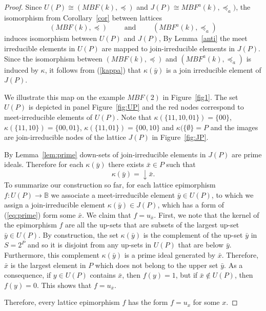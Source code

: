 \documentclass[10pt,letterpaper]{article}
\newcommand{\bbB}{\mathbb{B}}
\begin{document}
\begin{proof}
Since $U(P) \cong (MBF(k),\preceq)$ and $J(P) \cong MBF^a(k), \preceq_a)$, the isomorphism from Corollary~\ref{cor} between lattices 
\[ (MBF(k), \preceq) \qquad \mbox{ and } \qquad (MBF^a(k),\preceq_a) \]
induces isomorphism between $U(P)$ and $J(P)$, By Lemma~\ref{anti} the meet irreducible elements in $U(P)$ are mapped to join-irreducible elements in $J(P)$. Since the isomorphism between $(MBF(k), \preceq)$ and $(MBF^a(k),\preceq_a)$ is induced by $\kappa$, it follows from (\ref{kappa}) that 
$\kappa (\bar y)$ is a join irreducible element of $J(P)$.
 
We illustrate this map on the example $MBF(2)$ in Figure~\ref{fig1}. The set $U(P)$ is depicted in panel Figure~\ref{fig:UP} and the red nodes correspond to meet-irreducible elements of $U(P)$. Note that $\kappa(\{11,10,01\}) =\{00\} $, $\kappa(\{11,10\})= \{00,01\} $, $\kappa(\{11,01\}) =\{00, 10\} $ and $\kappa(\{\emptyset\} =P $ and the images are join-irreducible nodes of the lattice
$J(P)$ in Figure~\ref{fig:JP}.
 
By Lemma~\ref{lem:prime} down-sets of join-irreducible elements in $J(P)$ are prime ideals. Therefore for each $\kappa (\bar y)$ there exists $\bar x \in P$ such that 
\begin{equation}\label{eq:prime}
\kappa( \bar y) = \downarrow \bar x.
\end{equation}
To summarize our construction so far, for each lattice epimorphism $f:U(P) \to \bbB$ we associate a meet-irreducible element $\bar y \in U(P)$, to which we assign a join-irreducible element $\kappa(\bar y) \in J(P)$, which has a form of 
(\ref{eq:prime}) form some $\bar x$. We claim that 
$f = u_{\bar x}$.
First, we note that the kernel of the epimorphism $f$ are all the up-sets that are subsets of the largest up-set $\bar y \in U(P)$. By construction, the set $\kappa(\bar y)$ is the complement of the up-set $\bar y$ in $S=2^P$ and so it is disjoint from any up-sets in $U(P)$ that are below $\bar y$.
Furthermore, this complement $\kappa(\bar y)$ is a prime ideal generated by $\bar x$. Therefore, $\bar x$ is the largest element in $P$ which does not belong to the upper set $\bar y$.
As a consequence, if $y \in U(P)$ contains $\bar x$, then $f(y)=1$, but if $\bar x \notin U(P)$, then $f(y) =0$. This shows that $f = u_{\bar x}$.



Therefore, every lattice epimorphism $f$ has the form $f=u_x$ for some $x$. 


\end{proof}
\end{document}
